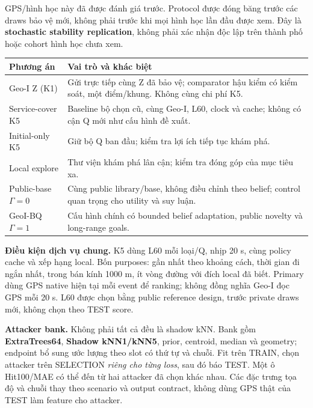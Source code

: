 \documentclass[10pt,a4paper]{article}
\begin{document}
GPS/hình học này đã được đánh giá trước. Protocol được đóng băng trước các draws bảo vệ mới,
không phải trước khi mọi hình học lần đầu được xem. Đây là \textbf{stochastic stability replication},
không phải xác nhận độc lập trên thành phố hoặc cohort hình học chưa xem.

\begin{tabularx}{\linewidth}{@{}P{3.8cm}Y@{}}\toprule
\textbf{Phương án} & \textbf{Vai trò và khác biệt}\\\midrule
Geo-I Z (K1) & Gửi trực tiếp cùng Z đã bảo vệ; comparator hậu kiểm có kiểm soát, một điểm/khung. Không cùng chi phí K5.\\
Service-cover K5 & Baseline bộ chọn cũ, cùng Geo-I, L60, clock và cache; không có cận Q mới như cấu hình đề xuất.\\
Initial-only K5 & Giữ bộ Q ban đầu; kiểm tra lợi ích tiếp tục khám phá.\\
Local explore & Thư viện khám phá lân cận; kiểm tra đóng góp của mục tiêu xa.\\
Public-base $\Gamma=0$ & Cùng public library/base, không điều chỉnh theo belief; control quan trọng cho utility và suy luận.\\
GeoI-BQ $\Gamma=1$ & Cấu hình chính có bounded belief adaptation, public novelty và long-range goals.\\\bottomrule
\end{tabularx}

\textbf{Điều kiện dịch vụ chung.} K5 dùng L60 mỗi loại/Q, nhịp 20 s, cùng policy cache và xếp hạng local.
Bốn purposes: gần nhất theo khoảng cách, thời gian đi ngắn nhất, trong bán kính 1000 m, ít vòng đường với
đích local đã biết. Primary dùng GPS native hiện tại mỗi event để ranking; không đồng nghĩa Geo-I đọc GPS mỗi 20 s.
L60 được chọn bằng public reference design, trước private draws mới, không chọn theo TEST score.

\textbf{Attacker bank.} Không phải tất cả đều là shadow kNN. Bank gồm \textbf{ExtraTrees64},
\textbf{Shadow kNN1/kNN5}, prior, centroid, median và geometry; endpoint bổ sung ước lượng theo slot có thứ tự và chuỗi.
Fit trên TRAIN, chọn attacker trên SELECTION \emph{riêng cho từng loss}, sau đó báo TEST.
Một ô Hit100/MAE có thể đến từ hai attacker đã chọn khác nhau. Các đặc trưng tọa độ và chuỗi thay theo scenario
và output contract, không dùng GPS thật của TEST làm feature cho attacker.
\end{document}
